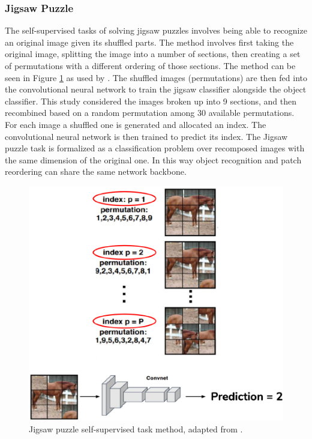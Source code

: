 \documentclass[10pt,twocolumn,letterpaper]{article}
\begin{document}
\subsubsection*{Jigsaw Puzzle}

The self-supervised tasks of solving jigsaw puzzles involves being able to recognize an original image given its shuffled parts. The method involves first taking the original image, splitting the image into a number of sections, then creating a set of permutations with a different ordering of those sections. The method can be seen in Figure \ref{fig:jigsaw} as used by \cite{Carlucci2019}. The shuffled images (permutations) are then fed into the convolutional neural network to train the jigsaw classifier alongside the object classifier. This study considered the images broken up into 9 sections, and then recombined based on a random permutation among 30 available permutations. For each image a shuffled one is generated and allocated an index. The convolutional neural network is then trained to predict its index. The Jigsaw puzzle task is formalized as a classification problem over recomposed images with the same dimension of the original one. In this way object recognition and patch reordering can share the same network backbone.

\begin{figure}[!htbp]
  \centering
   \includegraphics[width=\linewidth]{Figures/Jigsaw2.png}
   \caption{Jigsaw puzzle self-supervised task method, adapted from \cite{Carlucci2019}.}
   \label{fig:jigsaw}
\end{figure}
\end{document}
